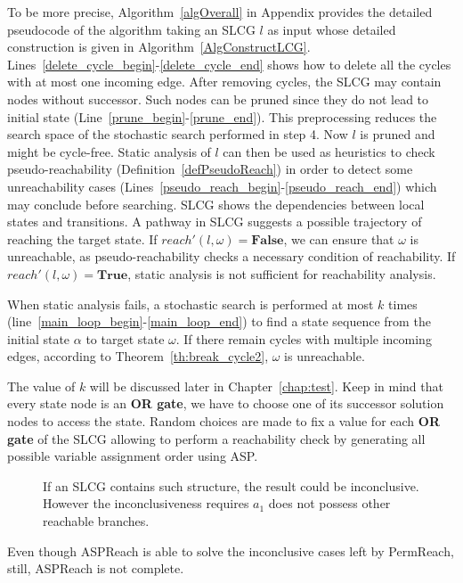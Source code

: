To be more precise, Algorithm~\ref{algOverall} in Appendix provides the detailed pseudocode of the algorithm taking an SLCG $l$ as input whose detailed construction is given in Algorithm~\ref{AlgConstructLCG}.
Lines~\ref{delete_cycle_begin}-\ref{delete_cycle_end} shows how to delete all the cycles with at most one incoming edge.
After removing cycles, the SLCG may contain nodes without successor.
Such nodes can be pruned since they do not lead to initial state (Line~\ref{prune_begin}-\ref{prune_end}).
This preprocessing reduces the search space of the stochastic search performed in step 4.
Now $l$ is pruned and might be cycle-free.
Static analysis of $l$ can then be used as heuristics to check pseudo-reachability (Definition~\ref{defPseudoReach}) in order to detect some unreachability cases (Lines~\ref{pseudo_reach_begin}-\ref{pseudo_reach_end}) which may conclude before searching.
SLCG shows the dependencies between local states and transitions. 
A pathway in SLCG suggests a possible trajectory of reaching the target state. 
If $reach'(l,\omega)=\textbf{False}$, we can ensure that $\omega$ is unreachable, as pseudo-reachability checks a necessary condition of reachability.
If $reach'(l,\omega)=\textbf{True}$, static analysis is not sufficient for reachability analysis. 

When static analysis fails, a stochastic search is performed at most $k$ times (line~\ref{main_loop_begin}-\ref{main_loop_end}) to find a state sequence from the initial state $\alpha$ to target state $\omega$.
If there remain cycles with multiple incoming edges, according to Theorem~\ref{th:break_cycle2}, $\omega$ is unreachable.

The value of $k$ will be discussed later in Chapter~\ref{chap:test}.
Keep in mind that every state node is an \textbf{OR gate}, we have to choose one of its successor solution nodes to access the state. 
Random choices are made to fix a value for each \textbf{OR gate} of the SLCG allowing to perform a reachability check by generating all possible variable assignment order using ASP.

\begin{figure}[ht]
    \centering
    
    \caption[Counterexample of ASPReach]{If an SLCG contains such structure, the result could be inconclusive.
    However the inconclusiveness requires $a_1$ does not possess other reachable branches.}
    \label{fig:lcgInconc}
\end{figure}
Even though ASPReach is able to solve the inconclusive cases left by PermReach, still, ASPReach is not complete.

